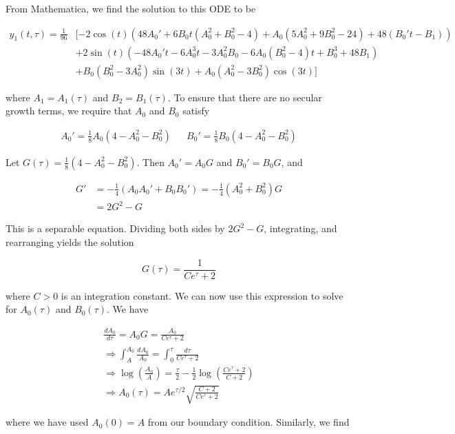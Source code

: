 \documentclass[12pt, a4paper]{article}
\begin{document}
\begin{enumerate}
\begin{enumerate}
    From Mathematica, we find the solution to this ODE to be

    \begin{align*}
        y_1(t,\tau) = \frac{1}{96} &[-2 \cos (t) \left(48 A_0'+6 B_0 t \left(A_0^2+B_0^2-4\right)+A_0 \left(5 A_0^2+9 B_0^2-24\right)+48 (B_0' t-B_1)\right) \\ &+2 \sin (t) \left(-48 A_0' t-6 A_0^3 t-3 A_0^2 B_0-6 A_0 \left(B_0^2-4\right) t+B_0^3+48 B_1\right) \\ &+B_0 \left(B_0^2-3 A_0^2\right) \sin (3 t) +A_0 \left(A_0^2-3 B_0^2\right) \cos (3 t)]
    \end{align*}

    where $A_1 = A_1(\tau)$ and $B_2 =B_1(\tau)$. To ensure that there are no secular growth terms, we require that $A_0$ and $B_0$ satisfy

    \begin{align*}
        A_0' = \frac{1}{8} A_0(4- A_0^2 - B_0^2) && B_0' = \frac{1}{8}B_0(4- A_0^2 - B_0^2)
    \end{align*}

    Let $G(\tau) = \frac{1}{8} (4-A_0^2 -B_0^2)$. Then $A_0' = A_0 G$ and $B_0' = B_0 G$, and 

    \begin{align*}
        G' &= -\frac{1}{4}(A_0A_0' + B_0B_0') = -\frac{1}{4}(A_0^2 + B_0^2)G \\&= 2G^2 - G
    \end{align*}

    This is a separable equation. Dividing both sides by $2G^2-G$, integrating, and rearranging yields the solution

    $$G(\tau) = \frac{1}{C e^\tau + 2}$$

    where $C>0$ is an integration constant. We can now use this expression to solve for $A_0(\tau)$ and $B_0(\tau)$. We have

    \begin{align*}
        \frac{dA_0}{d\tau} = A_0 G = \frac{A_0}{C e^\tau + 2} \\
        \Rightarrow \int_A^{A_0} \frac{dA_0}{A_0} = \int_0^\tau \frac{d\tau}{Ce^\tau +2}\\
        \Rightarrow \log\left(\frac{A_0}{A}\right) = \frac{\tau}{2} - \frac{1}{2}\log\left(\frac{Ce^\tau +2}{C+2}\right)\\
        \Rightarrow A_0(\tau) = A e^{\tau/2} \sqrt{\frac{C +2}{Ce^{\tau}+2}}    
    \end{align*}

    where we have used $A_0(0)=A$ from our boundary condition. Similarly, we find


\end{enumerate}
\end{enumerate}
\end{document}
